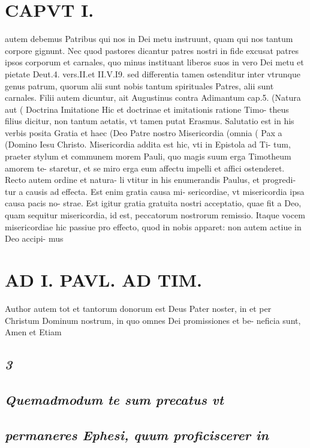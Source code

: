 \documentclass{article}
\begin{document}
\begin{pages}
\section*{CAPVT  I. }
\marginpar{[ p.5 ]}autem debemus Patribus qui nos in Dei metu instruunt, quam qui nos tantum corpore gignunt. Nec quod pastores dicantur patres nostri in fide excusat patres ipsos corporum et carnales, quo minus instituant liberos suos in vero Dei metu et pietate Deut.4. vers.II.et II.V.I9. sed differentia tamen ostenditur inter vtrunque genus patrum, quorum alii sunt nobis tantum spirituales Patres, alii sunt carnales. Filii autem dicuntur, ait Augustinus contra Adimantum cap.5. (Natura aut ( Doctrina Imitatione Hic et doctrinae et imitationis ratione Timo- theus filius dicitur, non tantum aetatis, vt tamen putat Erasmus. Salutatio est in his verbis posita Gratia et haec (Deo Patre nostro Misericordia (omnia ( Pax a (Domino Iesu Christo. Misericordia addita est hic, vti in Epistola ad Ti- tum, praeter stylum et communem morem Pauli, quo magis suum erga Timotheum amorem te- staretur, et se miro erga eum affectu impelli et affici ostenderet. Recto autem ordine et natura- li vtitur in his enumerandis Paulus, et progredi- tur a causis ad effecta. Est enim gratia causa mi- sericordiae, vt misericordia ipsa causa pacis no- strae. Est igitur gratia gratuita nostri acceptatio, quae fit a Deo, quam sequitur misericordia, id est, peccatorum nostrorum remissio. Itaque vocem misericordiae hic passiue pro effecto, quod in nobis apparet: non autem actiue in Deo accipi- mus 
\section*{AD I. PAVL. AD TIM. }
\marginpar{[ p.6 ]}Author autem tot et tantorum donorum est Deus Pater noster, in et per Christum Dominum nostrum, in quo omnes Dei promissiones et be- neficia sunt, Amen et Etiam 
{}
\subsection*{\textit{3}} 
{}
\subsection*{\textit{Quemadmodum te sum precatus vt}} 
{}
\subsection*{\textit{permaneres Ephesi, quum proficiscerer in}} 
{}

\end{pages}
\end{document}
